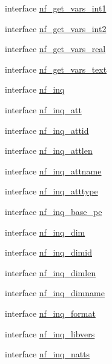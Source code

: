 \begin{DoxyCompactItemize}
\item 
interface \hyperlink{interfacenetcdf__nf__interfaces_1_1nf__get__vars__int1}{nf\+\_\+get\+\_\+vars\+\_\+int1}
\item 
interface \hyperlink{interfacenetcdf__nf__interfaces_1_1nf__get__vars__int2}{nf\+\_\+get\+\_\+vars\+\_\+int2}
\item 
interface \hyperlink{interfacenetcdf__nf__interfaces_1_1nf__get__vars__real}{nf\+\_\+get\+\_\+vars\+\_\+real}
\item 
interface \hyperlink{interfacenetcdf__nf__interfaces_1_1nf__get__vars__text}{nf\+\_\+get\+\_\+vars\+\_\+text}
\item 
interface \hyperlink{interfacenetcdf__nf__interfaces_1_1nf__inq}{nf\+\_\+inq}
\item 
interface \hyperlink{interfacenetcdf__nf__interfaces_1_1nf__inq__att}{nf\+\_\+inq\+\_\+att}
\item 
interface \hyperlink{interfacenetcdf__nf__interfaces_1_1nf__inq__attid}{nf\+\_\+inq\+\_\+attid}
\item 
interface \hyperlink{interfacenetcdf__nf__interfaces_1_1nf__inq__attlen}{nf\+\_\+inq\+\_\+attlen}
\item 
interface \hyperlink{interfacenetcdf__nf__interfaces_1_1nf__inq__attname}{nf\+\_\+inq\+\_\+attname}
\item 
interface \hyperlink{interfacenetcdf__nf__interfaces_1_1nf__inq__atttype}{nf\+\_\+inq\+\_\+atttype}
\item 
interface \hyperlink{interfacenetcdf__nf__interfaces_1_1nf__inq__base__pe}{nf\+\_\+inq\+\_\+base\+\_\+pe}
\item 
interface \hyperlink{interfacenetcdf__nf__interfaces_1_1nf__inq__dim}{nf\+\_\+inq\+\_\+dim}
\item 
interface \hyperlink{interfacenetcdf__nf__interfaces_1_1nf__inq__dimid}{nf\+\_\+inq\+\_\+dimid}
\item 
interface \hyperlink{interfacenetcdf__nf__interfaces_1_1nf__inq__dimlen}{nf\+\_\+inq\+\_\+dimlen}
\item 
interface \hyperlink{interfacenetcdf__nf__interfaces_1_1nf__inq__dimname}{nf\+\_\+inq\+\_\+dimname}
\item 
interface \hyperlink{interfacenetcdf__nf__interfaces_1_1nf__inq__format}{nf\+\_\+inq\+\_\+format}
\item 
interface \hyperlink{interfacenetcdf__nf__interfaces_1_1nf__inq__libvers}{nf\+\_\+inq\+\_\+libvers}
\item 
interface \hyperlink{interfacenetcdf__nf__interfaces_1_1nf__inq__natts}{nf\+\_\+inq\+\_\+natts}

\end{DoxyCompactItemize}
